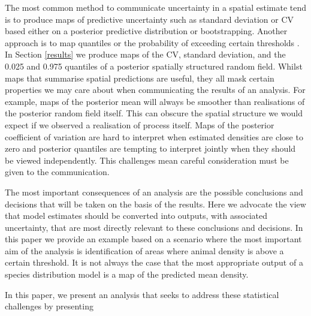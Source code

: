 \documentclass[preprint,12pt]{elsarticle}
\begin{document}
The most common method to communicate uncertainty in a spatial estimate tend is to produce maps of predictive uncertainty such as standard deviation or CV \citep{fuller_novel_2018, vallejo_responses_2017,bradbury_mapping_2014} based either on a posterior predictive distribution or bootstrapping.  Another approach is to map quantiles or the probability of exceeding certain thresholds \citep{russell_avoidance_2016, wilson_hierarchical_2010}.  In Section \ref{results} we produce maps of the CV, standard deviation, and the 0.025 and 0.975 quantiles of a posterior spatially structured random field.  Whilst maps that summarise spatial predictions are useful, they all mask certain properties we may care about when communicating the results of an analysis.  For example, maps of the posterior mean will always be smoother than realisations of the posterior random field itself.  This can obscure the spatial structure we would expect if we observed a realisation of process itself.  Maps of the posterior coefficient of variation are hard to interpret when estimated densities are close to zero and posterior quantiles are tempting to interpret jointly when they should be viewed independently.  This challenges mean careful consideration must be given to the communication. 

The most important consequences of an analysis are the possible conclusions and decisions that will be taken on the basis of the results.  Here we advocate the view that model estimates should be converted into outputs, with associated uncertainty, that are most directly relevant to these conclusions and decisions.  In this paper we provide an example based on a scenario where the most important aim of the analysis is identification of areas where animal density is above a certain threshold.  It is not always the case that the most appropriate output of a species distribution model is a map of the predicted mean density.        

In this paper, we present an analysis that seeks to address these statistical challenges by presenting
\end{document}
